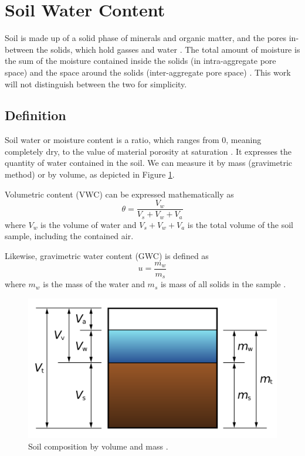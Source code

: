 \section{Soil Water Content}
Soil is made up of a solid phase of minerals and organic matter, and the pores in-between the solids, which hold gasses and water \cite{paul_soil_2007}. The total amount of moisture is the sum of the moisture contained inside the solids (in intra-aggregate pore space) and the space around the solids (inter-aggregate pore space) \cite{myjove_corporation_determination_2024}. This work will not distinguish between the two for simplicity.

\subsection{Definition}
Soil water or moisture content is a ratio, which ranges from 0, meaning completely dry, to the value of material porosity at saturation \cite{webster_humidity_1998}. It expresses the quantity of water contained in the soil. We can measure it by mass (gravimetric method) or by volume, as depicted in Figure \ref{fig:soil-phase-diagram}.

Volumetric content (VWC) can be expressed mathematically as
\begin{equation}
    \label{equation:volumetric-content} \theta = \dfrac{V_w}{V_s + V_w + V_a}
\end{equation}
where $V_w$ is the volume of water and $V_s + V_w + V_a$ is the total volume of the soil sample, including the contained air.

Likewise, gravimetric water content (GWC) is defined as
\begin{equation}
    \label{equation:gravimetric-content} u = \dfrac{m_w}{m_s}
\end{equation}
where $m_w$ is the mass of the water and $m_s$ is mass of all solids in the sample \cite{edaphic_scientific_pty_ltd_how_2024}.

\begin{figure}
    \includegraphics[width=.5\textwidth]{fig/soil-phase-diagram.png}
    \caption{\label{fig:soil-phase-diagram} Soil composition by volume and mass \cite{noauthor_water_2023}.}
\end{figure}

